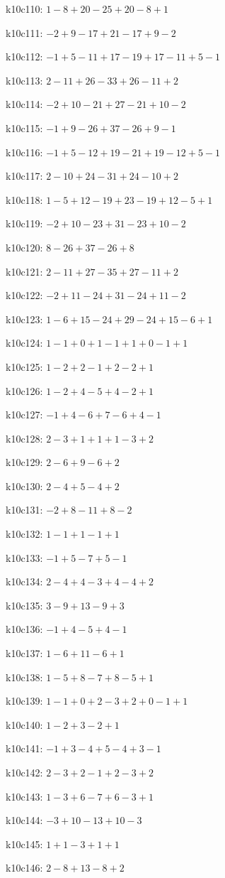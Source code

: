 k10c110: $ 1-8+20-25+20-8+1 $ 

k10c111: $ -2+9-17+21-17+9-2 $ 

k10c112: $ -1+5-11+17-19+17-11+5-1 $ 

k10c113: $ 2-11+26-33+26-11+2 $ 

k10c114: $ -2+10-21+27-21+10-2 $ 

k10c115: $ -1+9-26+37-26+9-1 $ 

k10c116: $ -1+5-12+19-21+19-12+5-1 $ 

k10c117: $ 2-10+24-31+24-10+2 $ 

k10c118: $ 1-5+12-19+23-19+12-5+1 $ 

k10c119: $ -2+10-23+31-23+10-2 $ 

k10c120: $ 8-26+37-26+8 $ 

k10c121: $ 2-11+27-35+27-11+2 $ 

k10c122: $ -2+11-24+31-24+11-2 $ 

k10c123: $ 1-6+15-24+29-24+15-6+1 $ 

k10c124: $ 1-1+0+1-1+1+0-1+1 $ 

k10c125: $ 1-2+2-1+2-2+1 $ 

k10c126: $ 1-2+4-5+4-2+1 $ 

k10c127: $ -1+4-6+7-6+4-1 $ 

k10c128: $ 2-3+1+1+1-3+2 $ 

k10c129: $ 2-6+9-6+2 $ 

k10c130: $ 2-4+5-4+2 $ 

k10c131: $ -2+8-11+8-2 $ 

k10c132: $ 1-1+1-1+1 $ 

k10c133: $ -1+5-7+5-1 $ 

k10c134: $ 2-4+4-3+4-4+2 $ 

k10c135: $ 3-9+13-9+3 $ 

k10c136: $ -1+4-5+4-1 $ 

k10c137: $ 1-6+11-6+1 $ 

k10c138: $ 1-5+8-7+8-5+1 $ 

k10c139: $ 1-1+0+2-3+2+0-1+1 $ 

k10c140: $ 1-2+3-2+1 $ 

k10c141: $ -1+3-4+5-4+3-1 $ 

k10c142: $ 2-3+2-1+2-3+2 $ 

k10c143: $ 1-3+6-7+6-3+1 $ 

k10c144: $ -3+10-13+10-3 $ 

k10c145: $ 1+1-3+1+1 $ 

k10c146: $ 2-8+13-8+2 $ 

